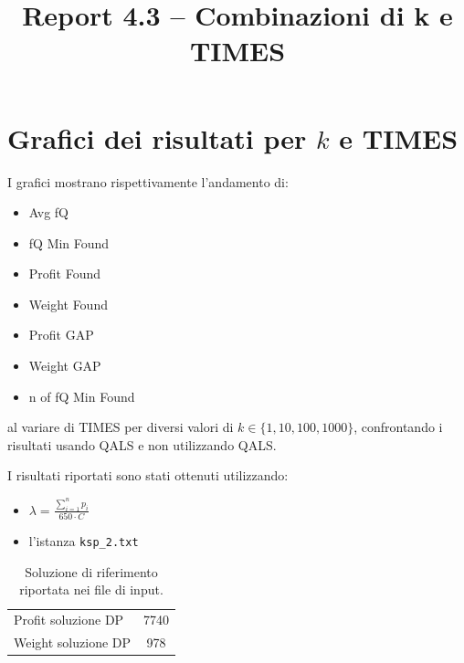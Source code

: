 \documentclass[a4paper,12pt]{article}
\title{Report 4.3 -- Combinazioni di k e TIMES}
\begin{document}
\maketitle

\newpage

\section{Grafici dei risultati per $k$ e TIMES}

I grafici mostrano rispettivamente l'andamento di:
\begin{itemize}
    \item Avg fQ
    \item fQ Min Found
    \item Profit Found
    \item Weight Found
    \item Profit GAP
    \item Weight GAP
    \item n of fQ Min Found
\end{itemize}
al variare di TIMES per diversi valori di $k \in \{1,10,100,1000\}$, confrontando
i risultati usando QALS e non utilizzando QALS.

I risultati riportati sono stati ottenuti utilizzando:

\begin{itemize}
    \item $\lambda = \frac{\sum_{i=1}^{n} p_i}{650 \cdot C}$
    \item l'istanza \texttt{ksp\_2.txt}
\end{itemize}

\begin{table}[H]
\centering
\begin{tabular}{lc}
\hline
Profit soluzione DP & 7740 \\
Weight soluzione DP & 978 \\
\hline
\end{tabular}
\caption{Soluzione di riferimento riportata nei file di input.}
\label{tab:knapsack-solution}
\end{table}
\end{document}
